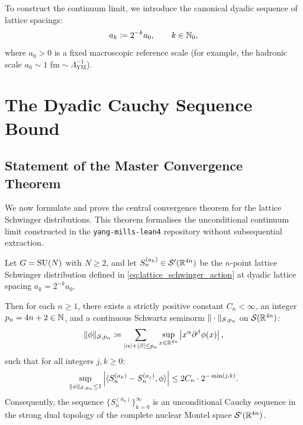 To construct the continuum limit, we introduce the canonical dyadic sequence of lattice spacings:
\begin{equation}
\label{eq:dyadic_sequence_def}
a_k \coloneqq 2^{-k} a_0, \qquad k \in \mathbb{N}_0,
\end{equation}
where $a_0 > 0$ is a fixed macroscopic reference scale (for example, the hadronic scale $a_0 \sim 1\text{ fm} \sim \Lambda_{\mathrm{YM}}^{-1}$).

\section{The Dyadic Cauchy Sequence Bound}
\label{sec:dyadic_cauchy_bound}

\subsection{Statement of the Master Convergence Theorem}
\label{subsec:master_cauchy_statement}

We now formulate and prove the central convergence theorem for the lattice Schwinger distributions. This theorem formalises the unconditional continuum limit constructed in the \texttt{yang-mills-lean4} repository without subsequential extraction.

\begin{theorem}
\label{thm:dyadic_cauchy}
Let $G = \mathrm{SU}(N)$ with $N \ge 2$, and let $S_n^{(a_k)} \in \mathcal{S}'(\mathbb{R}^{4n})$ be the $n$-point lattice Schwinger distribution defined in \eqref{eq:lattice_schwinger_action} at dyadic lattice spacing $a_k = 2^{-k} a_0$.

Then for each $n \ge 1$, there exists a strictly positive constant $C_n < \infty$, an integer $p_n = 4n + 2 \in \mathbb{N}$, and a continuous Schwartz seminorm $\|\cdot\|_{\mathcal{S}, p_n}$ on $\mathcal{S}(\mathbb{R}^{4n})$:
\begin{equation}
\label{eq:master_seminorm_def}
\|\phi\|_{\mathcal{S}, p_n} \coloneqq \sum_{|\alpha| + |\beta| \le p_n} \sup_{x \in \mathbb{R}^{4n}} \left| x^\alpha \partial^\beta \phi(x) \right|,
\end{equation}
such that for all integers $j, k \ge 0$:
\begin{equation}
\label{eq:dyadic_cauchy_inequality}
\sup_{\|\phi\|_{\mathcal{S}, p_n} \le 1} \left| \langle S_n^{(a_k)} - S_n^{(a_j)}, \phi \rangle \right| \le 2 C_n \cdot 2^{-\min(j, k)}.
\end{equation}
Consequently, the sequence $\{S_n^{(a_k)}\}_{k=0}^\infty$ is an unconditional Cauchy sequence in the strong dual topology of the complete nuclear Montel space $\mathcal{S}'(\mathbb{R}^{4n})$.
\end{theorem}

